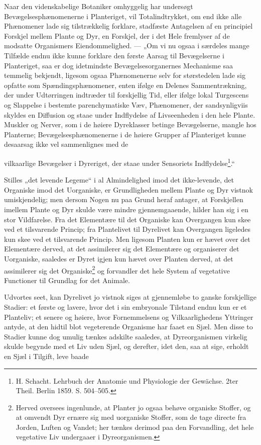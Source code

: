 \documentclass[12pt,a4paper]{book}
\begin{document}
Naar den videnskabelige Botaniker omhyggelig har undersøgt
Bevægelsesphænomenerne i Planteriget, vil Totalindtrykket, om end ikke alle
Phænomener lade sig tilstrækkelig forklare, stadfæste Antagelsen af en
principiel Forskjel mellem Plante og Dyr, en Forskjel, der i det Hele fremlyser
af de modsatte Organismers Eiendommelighed. --- „Om vi nu ogsaa i særdeles
mange Tilfælde endnu ikke kunne forklare den første Aarsag til Bevægelserne i
Planteriget, saa er dog idetmindste Bevægelsesorganernes Mechanisme saa
temmelig bekjendt, ligesom ogsaa Phænomenerne selv for størstedelen lade sig
opfatte som Spændingsphænomener, enten ifølge en Delenes Sammentrækning, der
under Udtørringen indtræder til forskjellig Tid, eller ifølge lokal Turgescens
og Slappelse i bestemte parenchymatiske Væv, Phænomener, der sandsynligviis
skyldes en Diffusion og staae under Indflydelse af Livseenheden i den hele
Plante. Muskler og Nerver, som i de høiere Dyreklasser betinge Bevægelserne,
mangle hos Planterne; Bevægelsesphænomenerne i de høiere Grupper af Planteriget
kunne desaarsag ikke vel sammenlignes med de

\setcounter{footnote}{0}
vilkaarlige Bevægelser i Dyreriget, der staae under Sensoriets
Indflydelse\footnote{H. Schacht. Lehrbuch der Anatomie und Physiologie der
Gewächse. 2ter Theil. Berlin 1859. S. 504--505.}.“

Stilles „det levende Legeme“ i al Almindelighed imod det ikke-levende, det
Organiske imod det Uorganiske, er Grundligheden mellem Plante og Dyr vistnok
umiskjendelig; men dersom Nogen nu paa Grund heraf antager, at Forskjellen
imellem Plante og Dyr skulde være mindre gjennemgaaende, hilder han sig i en
stor Vildfarelse. Fra det Elementære til det Organiske kan Overgangen kun skee
ved et tilsvarende Princip; fra Plantelivet til Dyrelivet kan Overgangen
ligeledes kun skee ved et tilsvarende Princip. Men ligesom Planten kun er hævet
over det Elementære derved, at det assimilerer sig det Elementære og
organiserer det Uorganiske, saaledes er Dyret igjen kun hævet over Planten
derved, at det assimilerer sig det Organiske\footnote{Herved oversees
ingenlunde, at Planter jo ogsaa behøve organiske Stoffer, og at omvendt Dyr
ernære sig med uorganiske Stoffer, som de tage directe fra Jorden, Luften og
Vandet; her tænkes derimod paa den Forvandling, det hele vegetative Liv
undergaaer i Dyreorganismen.} og forvandler det hele System af vegetative
Functioner til Grundlag for det Animale.

Udvortes seet, kan Dyrelivet jo vistnok siges at gjennemløbe to ganske
forskjellige Stadier: et første og lavere, hvor det i sin embryonale Tilstand
endnu kun er et Planteliv; et senere og høiere, hvor Fornemmelsens og
Vilkaarlighedens Yttringer antyde, at den hidtil blot vegeterende Organisme har
faaet en Sjæl. Men disse to Stadier kunne dog umulig tænkes adskilte saaledes,
at Dyreorganismen virkelig skulde begynde med et Liv uden Sjæl, og derefter,
idet den, saa at sige, erholdt en Sjæl i Tilgift, leve baade
\end{document}
